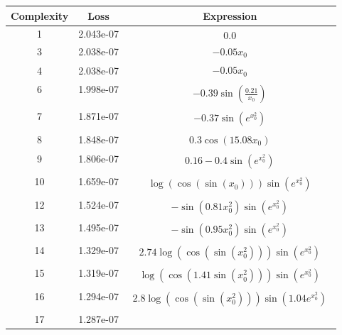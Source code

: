 \begin{center}
        \begin{tabular}{|c|c|c|}
        \hline
        Complexity & Loss & Expression \\
        \hline
        1 & 2.043e-07 & $\begin{aligned}0.0\end{aligned}$\\ \hline3 & 2.038e-07 & $\begin{aligned}- 0.05 x_{0}\end{aligned}$\\ \hline4 & 2.038e-07 & $\begin{aligned}- 0.05 x_{0}\end{aligned}$\\ \hline6 & 1.998e-07 & $\begin{aligned}- 0.39 \sin{\left(\frac{0.21}{x_{0}} \right)}\end{aligned}$\\ \hline7 & 1.871e-07 & $\begin{aligned}- 0.37 \sin{\left(e^{x_{0}^{2}} \right)}\end{aligned}$\\ \hline8 & 1.848e-07 & $\begin{aligned}0.3 \cos{\left(15.08 x_{0} \right)}\end{aligned}$\\ \hline9 & 1.806e-07 & $\begin{aligned}0.16 - 0.4 \sin{\left(e^{x_{0}^{2}} \right)}\end{aligned}$\\ \hline10 & 1.659e-07 & $\begin{aligned}\log{\left(\cos{\left(\sin{\left(x_{0} \right)} \right)} \right)} \sin{\left(e^{x_{0}^{2}} \right)}\end{aligned}$\\ \hline12 & 1.524e-07 & $\begin{aligned}- \sin{\left(0.81 x_{0}^{2} \right)} \sin{\left(e^{x_{0}^{2}} \right)}\end{aligned}$\\ \hline13 & 1.495e-07 & $\begin{aligned}- \sin{\left(0.95 x_{0}^{2} \right)} \sin{\left(e^{x_{0}^{2}} \right)}\end{aligned}$\\ \hline14 & 1.329e-07 & $\begin{aligned}2.74 \log{\left(\cos{\left(\sin{\left(x_{0}^{2} \right)} \right)} \right)} \sin{\left(e^{x_{0}^{2}} \right)}\end{aligned}$\\ \hline15 & 1.319e-07 & $\begin{aligned}\log{\left(\cos{\left(1.41 \sin{\left(x_{0}^{2} \right)} \right)} \right)} \sin{\left(e^{x_{0}^{2}} \right)}\end{aligned}$\\ \hline16 & 1.294e-07 & $\begin{aligned}2.8 \log{\left(\cos{\left(\sin{\left(x_{0}^{2} \right)} \right)} \right)} \sin{\left(1.04 e^{x_{0}^{2}} \right)}\end{aligned}$\\ \hline17 & 1.287e-07 
\end{tabular}
\end{center}

